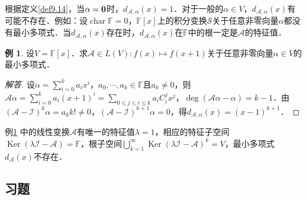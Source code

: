 \documentclass[a4paper,fontset=windows]{ctexbook}
\theoremstyle{definition}
\newtheorem{example}{例}[chapter]
\DeclareMathOperator{\Char}{char}
\DeclareMathOperator{\Ker}{Ker}
\renewcommand{\le}{\leqslant}
\begin{document}
根据定义\ref{def9.14}，当$\alpha={\bf 0}$时，$d_{\mathcal{A},\alpha}(x)=1$．对于一般的$\alpha\in V$，$d_{\mathcal{A},\alpha}(x)$有可能不存在．例如：设$\Char\mathbb{F}=0$，$\mathbb{F}[x]$上的积分变换$\mathcal{S}$关于任意非零向量$\alpha$都没有最小多项式．当$d_{\mathcal{A},\alpha}(x)$存在时，$d_{\mathcal{A},\alpha}(x)$在$\mathbb{F}$中的根一定是$\mathcal{A}$的特征值．

\begin{example}\label{ex9.22}
设$V=\mathbb{F}[x]$．求$\mathcal{A}\in L(V):f(x)\mapsto f(x+1)$关于任意非零向量$\alpha\in V$的最小多项式．
\end{example}

\begin{proof}[解答]
设$\alpha=\sum\limits_{i=0}^ka_ix^i$，$a_0,\cdots,a_k\in\mathbb{F}$且$a_k\ne 0$，则$\mathcal{A}\alpha=\sum\limits_{i=0}^ka_i(x+1)^i=\sum\limits_{0\le j\le i\le k}a_iC_i^jx^j$，$\deg(\mathcal{A}\alpha-\alpha)=k-1$．由$(\mathcal{A-I})^k\alpha=a_kk!\ne 0$，$(\mathcal{A-I})^{k+1}\alpha=0$，得$d_{\mathcal{A},\alpha}(x)=(x-1)^{k+1}$．
\end{proof}

例\ref{ex9.22} 中的线性变换$\mathcal{A}$有唯一的特征值$\lambda=1$，相应的特征子空间$\Ker(\mathcal{\lambda I-A})=\mathbb{F}$，根子空间$\bigcup\limits_{k=1}^\infty\Ker(\mathcal{\lambda I-A})^k=V$，最小多项式$d_{\mathcal{A}}(x)$不存在．

\subsection*{习题}
\end{document}
